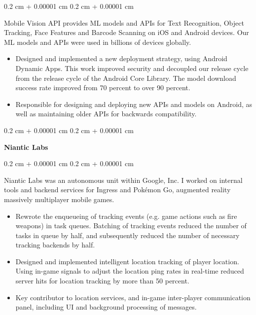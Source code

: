\documentclass[12pt, letterpaper]{article}
\newenvironment{highlights}{
    \begin{itemize}[
        topsep=0.10 cm,
        parsep=0.10 cm,
        partopsep=0pt,
        itemsep=0pt,
        leftmargin=0.4 cm + 10pt
    ]
}{
    \end{itemize}
} %
\newenvironment{onecolentry}{
    \begin{adjustwidth}{
        0.2 cm + 0.00001 cm
    }{
        0.2 cm + 0.00001 cm
    }
}{
    \end{adjustwidth}
} %
\begin{document}
        \begin{onecolentry}
            Mobile Vision API provides ML models and APIs for Text Recognition, Object Tracking, Face Features and Barcode Scanning on iOS and Android devices.  Our ML models and APIs were used in billions of devices globally.
            \begin{highlights}
                \item Designed and implemented a new deployment strategy, using Android Dynamic Apps. This work improved security and decoupled our release cycle from the release cycle of the Android Core Library.  The model download success rate improved from 70 percent to over 90 percent. 
                \item Responsible for designing and deploying new APIs and models on Android, as well as maintaining older APIs for backwards compatibility.
            \end{highlights}
        \end{onecolentry}
        
        \begin{onecolentry}
            \textbf{Niantic Labs}
        \end{onecolentry}

        \vspace{0.10 cm}
        \begin{onecolentry}
            Niantic Labs was an autonomous unit within Google, Inc.  I worked on internal tools and backend services for Ingress and Pokémon Go, augmented reality massively multiplayer mobile games.
            \begin{highlights}
                \item Rewrote the enqueueing of tracking events (e.g. game actions such as fire weapons) in task queues.  Batching of tracking events reduced the number of tasks in queue by half, and subsequently reduced the number of necessary tracking backends by half.
                \item Designed and implemented intelligent location tracking of player location.  Using in-game signals to adjust the location ping rates in real-time reduced server hits for location tracking by more than 50 percent.
                \item Key contributor to location services, and in-game inter-player communication panel, including UI and background processing of messages.
            \end{highlights}
        \end{onecolentry}
\end{document}
